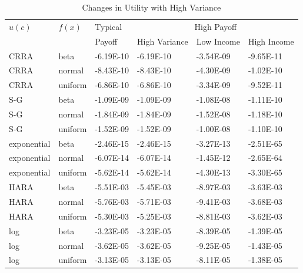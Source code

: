 \documentclass[letterpaper,12pt]{article}
\numberwithin{equation}{section}
\numberwithin{figure}{section}
\numberwithin{table}{section}
\begin{document}
\begin{spacing}{1.5}
	\begin{table}[ht] 
		\caption{Changes in Utility with High Variance}
		\label{tab_lottery1}
		\centering
		\footnotesize
		\begin{tabular}{|lll|lll|}
			\hline
			$u(c)$ & $f(x)$ & Typical & \multicolumn{3}{c}{High Payoff} \\
			& & Payoff & High Variance & Low Income & High Income \\
			\hline
			CRRA & beta & -6.19E-10 & -6.19E-10 & -3.54E-09 & -9.65E-11 \\
			CRRA & normal & -8.43E-10 & -8.43E-10 & -4.30E-09 & -1.02E-10 \\
			CRRA & uniform & -6.86E-10 & -6.86E-10 & -3.34E-09 & -9.52E-11 \\
			\hline
			S-G & beta & -1.09E-09 & -1.09E-09 & -1.08E-08 & -1.11E-10 \\
			S-G & normal & -1.84E-09 & -1.84E-09 & -1.52E-08 & -1.18E-10 \\
			S-G & uniform & -1.52E-09 & -1.52E-09 & -1.00E-08 & -1.10E-10 \\
			\hline
			exponential & beta & -2.46E-15 & -2.46E-15 & -3.27E-13 & -2.51E-65 \\
			exponential & normal & -6.07E-14 & -6.07E-14 & -1.45E-12 & -2.65E-64 \\
			exponential & uniform & -5.62E-14 & -5.62E-14 & -4.30E-13 & -3.30E-65 \\
			\hline
			HARA & beta & -5.51E-03 & -5.45E-03 & -8.97E-03 & -3.63E-03 \\
			HARA & normal & -5.76E-03 & -5.71E-03 & -9.41E-03 & -3.68E-03 \\
			HARA & uniform & -5.30E-03 & -5.25E-03 & -8.81E-03 & -3.62E-03 \\
			\hline
			log & beta & -3.23E-05 & -3.23E-05 & -8.39E-05 & -1.39E-05 \\
			log & normal & -3.62E-05 & -3.62E-05 & -9.25E-05 & -1.43E-05 \\
			log & uniform & -3.13E-05 & -3.13E-05 & -8.11E-05 & -1.38E-05 \\
			\hline
		\end{tabular}
	\end{table}


\end{spacing}
\end{document}
